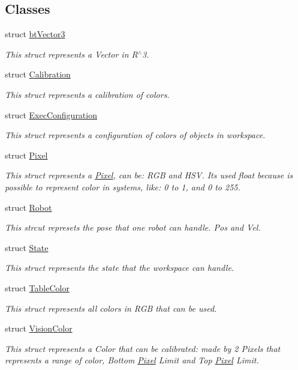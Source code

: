 \subsection*{Classes}
\begin{DoxyCompactItemize}
\item 
struct \hyperlink{structcommon_1_1btVector3}{bt\+Vector3}
\begin{DoxyCompactList}\small\item\em This struct represents a Vector in R$^\wedge$3. \end{DoxyCompactList}\item 
struct \hyperlink{structcommon_1_1Calibration}{Calibration}
\begin{DoxyCompactList}\small\item\em This struct represents a calibration of colors. \end{DoxyCompactList}\item 
struct \hyperlink{structcommon_1_1ExecConfiguration}{Exec\+Configuration}
\begin{DoxyCompactList}\small\item\em This struct represents a configuration of colors of objects in workspace. \end{DoxyCompactList}\item 
struct \hyperlink{structcommon_1_1Pixel}{Pixel}
\begin{DoxyCompactList}\small\item\em This struct represents a \hyperlink{structcommon_1_1Pixel}{Pixel}, can be\+: R\+GB and H\+SV. It\textquotesingle{}s used float because is possible to represent color in systems, like\+: 0 to 1, and 0 to 255. \end{DoxyCompactList}\item 
struct \hyperlink{structcommon_1_1Robot}{Robot}
\begin{DoxyCompactList}\small\item\em This strcut represets the pose that one robot can handle. Pos and Vel. \end{DoxyCompactList}\item 
struct \hyperlink{structcommon_1_1State}{State}
\begin{DoxyCompactList}\small\item\em This struct represents the state that the workspace can handle. \end{DoxyCompactList}\item 
struct \hyperlink{structcommon_1_1TableColor}{Table\+Color}
\begin{DoxyCompactList}\small\item\em This struct represents all colors in R\+GB that can be used. \end{DoxyCompactList}\item 
struct \hyperlink{structcommon_1_1VisionColor}{Vision\+Color}
\begin{DoxyCompactList}\small\item\em This struct represents a Color that can be calibrated\+: made by 2 Pixels that represents a range of color, Bottom \hyperlink{structcommon_1_1Pixel}{Pixel} Limit and Top \hyperlink{structcommon_1_1Pixel}{Pixel} Limit. \end{DoxyCompactList}\end{DoxyCompactItemize}
